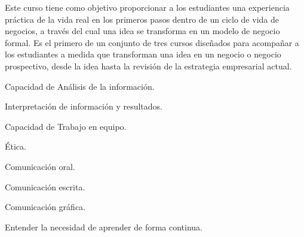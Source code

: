 \begin{syllabus}


\begin{justification}
Este curso tiene como objetivo proporcionar a los estudiantes una experiencia práctica de la vida  real en los  primeros pasos dentro de un ciclo de vida de negocios, a través del cual una idea se transforma en un modelo de negocio formal.
Es el primero de un conjunto de tres cursos diseñados para acompañar a los estudiantes a medida que transforman una idea en un negocio o negocio prospectivo, desde la idea  hasta la revisión de la estrategia empresarial actual.
\end{justification}

\begin{goals}
  \item Capacidad de Análisis de la información.
  \item Interpretación de información y resultados.
  \item Capacidad de Trabajo en equipo.
  \item Ética.
  \item Comunicación oral.
  \item Comunicación escrita.
  \item Comunicación gráfica.
  \item Entender la necesidad de aprender de forma continua.
\end{goals}

\begin{outcomes}
  \item {} 
  \item {} 
  \item {} 
  \item {} 
  \item {} 
\end{outcomes}

\begin{competences}
    \item {}
    \item {}
    \item {}
\end{competences}


\end{syllabus}
